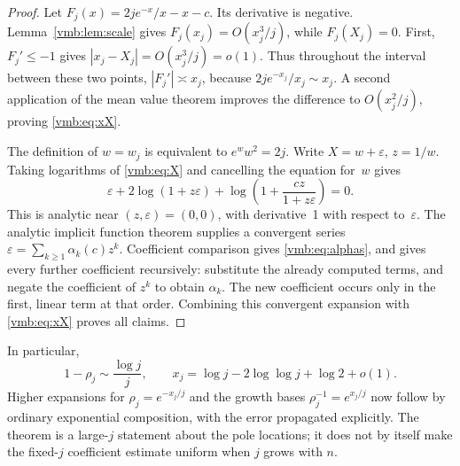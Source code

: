 \documentclass[11pt,a4paper]{article}
\numberwithin{equation}{section}
\theoremstyle{definition}\newtheorem{definition}[theorem]{Definition}
\theoremstyle{remark}\newtheorem{remark}[theorem]{Remark}
\begin{document}
\begin{proof}
Let \(F_j(x)=2je^{-x}/x-x-c\). Its derivative is negative.
Lemma~\ref{vmb:lem:scale} gives
\(F_j(x_j)=O(x_j^3/j)\), while \(F_j(X_j)=0\).
First, \(F_j'\leq-1\) gives
\(|x_j-X_j|=O(x_j^3/j)=o(1)\). Thus throughout the interval between
these two points, \(|F_j'|\asymp x_j\), because
\(2je^{-x_j}/x_j\sim x_j\). A second application of the mean value
theorem improves the difference to \(O(x_j^2/j)\), proving
\eqref{vmb:eq:xX}.

The definition of \(w=w_j\) is equivalent to \(e^w w^2=2j\).
Write \(X=w+\varepsilon\), \(z=1/w\). Taking logarithms of
\eqref{vmb:eq:X} and cancelling the equation for~\(w\) gives
\begin{equation}\label{vmb:eq:implicit-eps}
\varepsilon+2\log(1+z\varepsilon)
 +\log\left(1+\frac{cz}{1+z\varepsilon}\right)=0.
\end{equation}
This is analytic near \((z,\varepsilon)=(0,0)\), with derivative~1
with respect to~\(\varepsilon\). The analytic implicit function
theorem supplies a convergent series
\(\varepsilon=\sum_{k\geq1}\alpha_k(c)z^k\).
Coefficient comparison gives \eqref{vmb:eq:alphas}, and gives every further
coefficient recursively: substitute the already computed terms, and
negate the coefficient of \(z^k\) to obtain \(\alpha_k\). The new
coefficient occurs only in the first, linear term at that order.
Combining this convergent expansion with \eqref{vmb:eq:xX} proves all claims.
\end{proof}

In particular,
\begin{equation}\label{vmb:eq:rhorough}
1-\rho_j\sim\frac{\log j}{j},\qquad
x_j=\log j-2\log\log j+\log2+o(1).
\end{equation}
Higher expansions for \(\rho_j=e^{-x_j/j}\) and the growth bases
\(\rho_j^{-1}=e^{x_j/j}\) now follow by ordinary exponential
composition, with the error propagated explicitly. The theorem is a
large-\(j\) statement about the pole locations; it does not by itself
make the fixed-\(j\) coefficient estimate uniform when \(j\) grows with
\(n\).
\end{document}
